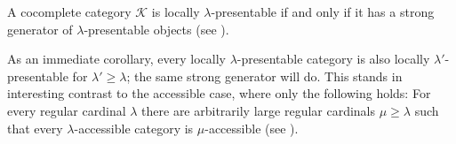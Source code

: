 \begin{Lemma}\label{lemma:stronggen}
A cocomplete category $\mathcal K$ is locally $\lambda$-presentable if and only if it has a strong generator of $\lambda$-presentable objects (see \cite[Theorem 1.20]{AdamekRosicky}).
\end{Lemma}

As an immediate corollary, every locally $\lambda$-presentable category is also locally $\lambda'$-presentable for $\lambda' \geq \lambda$; the same strong generator will do. This stands in interesting contrast to the accessible case, where only the following holds: For every regular cardinal $\lambda$ there are arbitrarily large regular cardinals $\mu \geq \lambda$ such that every $\lambda$-accessible category is $\mu$-accessible (see \cite[Theorem 2.14]{AdamekRosicky}). \\

